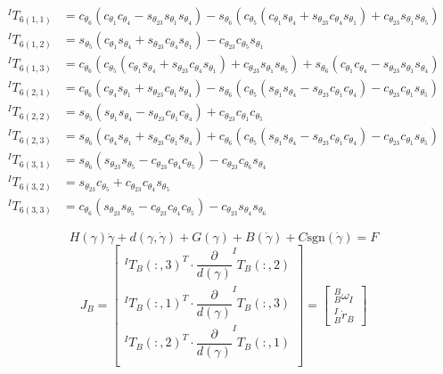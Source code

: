 \documentclass[12pt]{report}
\begin{document}
\[
\begin{aligned}
^IT_{6(1,1)} &=
c_{\theta_6}(c_{\theta_1}c_{\theta_4} - s_{\theta_{23}}s_{\theta_1}s_{\theta_4}) - s_{\theta_6}(c_{\theta_5}(c_{\theta_1}s_{\theta_4} + s_{\theta_{23}}c_{\theta_4}s_{\theta_1}) + c_{\theta_{23}}s_{\theta_1}s_{\theta_5})\\
^IT_{6(1,2)} &=
s_{\theta_5}(c_{\theta_1}s_{\theta_4} + s_{\theta_{23}}c_{\theta_4}s_{\theta_1}) - c_{\theta_{23}}c_{\theta_5}s_{\theta_1}\\
^IT_{6(1,3)} &=
c_{\theta_6}(c_{\theta_5}(c_{\theta_1}s_{\theta_4} + s_{\theta_{23}}c_{\theta_4}s_{\theta_1}) + c_{\theta_{23}}s_{\theta_1}s_{\theta_5}) + s_{\theta_6}(c_{\theta_1}c_{\theta_4} - s_{\theta_{23}}s_{\theta_1}s_{\theta_4})\\
^IT_{6(2,1)} &=
c_{\theta_6}(c_{\theta_4}s_{\theta_1} + s_{\theta_{23}}c_{\theta_1}s_{\theta_4}) - s_{\theta_6}(c_{\theta_5}(s_{\theta_1}s_{\theta_4} - s_{\theta_{23}}c_{\theta_1}c_{\theta_4}) - c_{\theta_{23}}c_{\theta_1}s_{\theta_5})\\
^IT_{6(2,2)} &=
s_{\theta_5}(s_{\theta_1}s_{\theta_4} - s_{\theta_{23}}c_{\theta_1}c_{\theta_4}) + c_{\theta_{23}}c_{\theta_1}c_{\theta_5}\\
^IT_{6(2,3)} &=
s_{\theta_6}(c_{\theta_4}s_{\theta_1} + s_{\theta_{23}}c_{\theta_1}s_{\theta_4}) + c_{\theta_6}(c_{\theta_5}(s_{\theta_1}s_{\theta_4} - s_{\theta_{23}}c_{\theta_1}c_{\theta_4}) - c_{\theta_{23}}c_{\theta_1}s_{\theta_5})\\
^IT_{6(3,1)} &=
s_{\theta_6}(s_{\theta_{23}}s_{\theta_5} - c_{\theta_{23}}c_{\theta_4}c_{\theta_5}) - c_{\theta_{23}}c_{\theta_6}s_{\theta_4}\\
^IT_{6(3,2)} &=
s_{\theta_{23}}c_{\theta_5} + c_{\theta_{23}}c_{\theta_4}s_{\theta_5}\\
^IT_{6(3,3)} &=
c_{\theta_6}(s_{\theta_{23}}s_{\theta_5} - c_{\theta_{23}}c_{\theta_4}c_{\theta_5}) - c_{\theta_{23}}s_{\theta_4}s_{\theta_6}
\end{aligned}
\]

\newpage

\begin{equation}
  H(\gamma)\ddot{\gamma}+d(\gamma,\dot{\gamma})+G(\gamma)+B(\dot{\gamma})+C\text{sgn}(\dot{\gamma}) = F
\end{equation}
\[
J_B =
\begin{bmatrix}
  ^IT_B(:,3)^T \cdot \dfrac{\partial}{d(\gamma)}^IT_B(:,2) \\
  ^IT_B(:,1)^T \cdot \dfrac{\partial}{d(\gamma)}^IT_B(:,3) \\
  ^IT_B(:,2)^T \cdot \dfrac{\partial}{d(\gamma)}^IT_B(:,1) \\
\end{bmatrix}
=
\begin{bmatrix}
  ^B_B\omega_I\\
  ^I_B\dot{r}_B
\end{bmatrix}
\]
\end{document}
